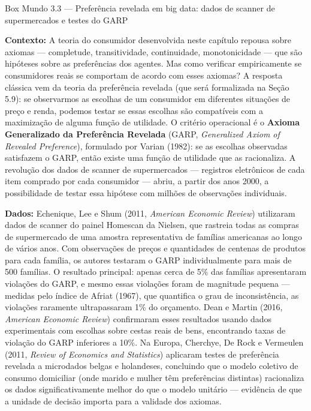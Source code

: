 \documentclass[11pt,twoside,openright]{book}
\begin{document}
\begin{boxmundobox}{Box Mundo 3.3 — Preferência revelada em big data: dados de scanner de supermercados e testes do GARP}

\textbf{Contexto:} A teoria do consumidor desenvolvida neste capítulo
repousa sobre axiomas --- completude, transitividade, continuidade,
monotonicidade --- que são hipóteses sobre as preferências dos agentes.
Mas como verificar empiricamente se consumidores reais se comportam de
acordo com esses axiomas? A resposta clássica vem da teoria da
preferência revelada (que será formalizada na Seção 5.9): se observarmos
as escolhas de um consumidor em diferentes situações de preço e renda,
podemos testar se essas escolhas são compatíveis com a maximização de
alguma função de utilidade. O critério operacional é o \textbf{Axioma
Generalizado da Preferência Revelada} (GARP, \emph{Generalized Axiom of
Revealed Preference}), formulado por Varian (1982): se as escolhas
observadas satisfazem o GARP, então existe uma função de utilidade que
as racionaliza. A revolução dos dados de scanner de supermercados ---
registros eletrônicos de cada item comprado por cada consumidor ---
abriu, a partir dos anos 2000, a possibilidade de testar essa hipótese
com milhões de observações individuais.

\textbf{Dados:} Echenique, Lee e Shum (2011, \emph{American Economic
Review}) utilizaram dados de scanner do painel Homescan da Nielsen, que
rastreia todas as compras de supermercado de uma amostra representativa
de famílias americanas ao longo de vários anos. Com observações de
preços e quantidades de centenas de produtos para cada família, os
autores testaram o GARP individualmente para mais de 500 famílias. O
resultado principal: apenas cerca de 5\% das famílias apresentaram
violações do GARP, e mesmo essas violações foram de magnitude pequena
--- medidas pelo índice de Afriat (1967), que quantifica o grau de
inconsistência, as violações raramente ultrapassaram 1\% do orçamento.
Dean e Martin (2016, \emph{American Economic Review}) confirmaram esses
resultados usando dados experimentais com escolhas sobre cestas reais de
bens, encontrando taxas de violação do GARP inferiores a 10\%. Na
Europa, Cherchye, De Rock e Vermeulen (2011, \emph{Review of Economics
and Statistics}) aplicaram testes de preferência revelada a microdados
belgas e holandeses, concluindo que o modelo coletivo de consumo
domiciliar (onde marido e mulher têm preferências distintas) racionaliza
os dados significativamente melhor do que o modelo unitário ---
evidência de que a unidade de decisão importa para a validade dos
axiomas.


\end{boxmundobox}
\end{document}
